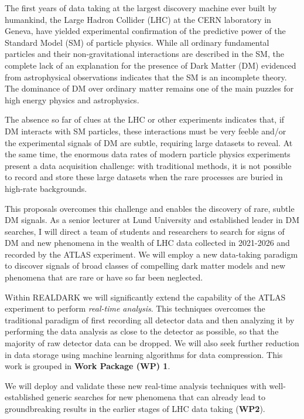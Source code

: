 The first years of data taking at the largest discovery machine ever built by humankind, the Large Hadron Collider (LHC) at the CERN laboratory in Geneva, have yielded experimental confirmation of the predictive power of the Standard Model (SM) of particle physics.
While all ordinary fundamental particles and their non-gravitational interactions are described in the SM, the complete lack of an explanation for the presence of Dark Matter (DM) evidenced from astrophysical observations indicates that the SM is an incomplete theory. The dominance of DM over ordinary matter remains one of the main puzzles for high energy physics and astrophysics. 

The absence so far of clues at the LHC or other experiments indicates that, if DM interacts with SM particles, these interactions must be very feeble and/or the experimental signals of DM are subtle, requiring large datasets to reveal. 
At the same time, the enormous data rates of modern particle physics experiments present a data acquisition challenge: with traditional methods, it is not possible to record and store these large datasets when the rare processes are buried in high-rate backgrounds. 

This proposals overcomes this challenge and enables the discovery of rare, subtle DM signals. 
As a senior lecturer at Lund University and established leader in DM searches, I will direct 
a team of students and researchers to search for signs of DM and new phenomena in the wealth of LHC data collected in 2021-2026 and recorded by the ATLAS experiment. We will employ a new data-taking paradigm to discover signals of broad classes of compelling dark matter models and new phenomena that are rare or have so far been neglected. 

Within \textsc{REALDARK} we will significantly extend the capability of the ATLAS experiment to perform \textit{real-time analysis}. This techniques overcomes the traditional paradigm of first recording all detector data and then analyzing it by performing the data analysis as close to the detector as possible, so that the majority of raw detector data can be dropped. We will also seek further reduction in data storage using machine learning algorithms for data compression. This work is grouped in \textbf{Work Package (WP) 1}.

We will deploy and validate these new real-time analysis techniques with well-established generic searches for new phenomena that can already lead to groundbreaking results in the earlier stages of LHC data taking (\textbf{WP2}).

